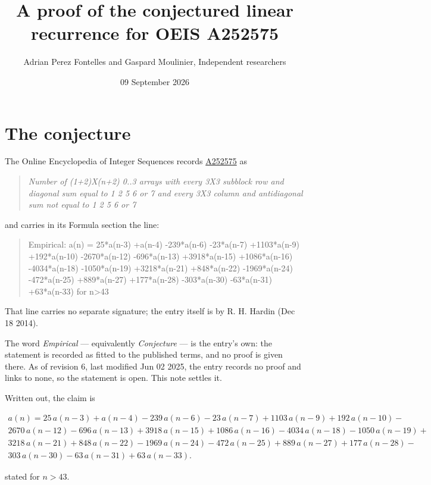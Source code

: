 \documentclass[11pt]{article}
\title{A proof of the conjectured linear recurrence for OEIS A252575}
\author{Adrian Perez Fontelles and Gaspard Moulinier, Independent researchers}
\date{09 September 2026}
\theoremstyle{definition}
\begin{document}
\maketitle
\section{The conjecture}

The Online Encyclopedia of Integer Sequences records \href{https://oeis.org/A252575}{A252575} as

\begin{quote}\itshape Number of (1+2)X(n+2) 0..3 arrays with every 3X3 subblock row and diagonal sum equal to 1 2 5 6 or 7 and every 3X3 column and antidiagonal sum not equal to 1 2 5 6 or 7\end{quote}

and carries in its Formula section the line:

\begin{quote}\ttfamily Empirical: a(n) = 25*a(n-3) +a(n-4) -239*a(n-6) -23*a(n-7) +1103*a(n-9) +192*a(n-10) -2670*a(n-12) -696*a(n-13) +3918*a(n-15) +1086*a(n-16) -4034*a(n-18) -1050*a(n-19) +3218*a(n-21) +848*a(n-22) -1969*a(n-24) -472*a(n-25) +889*a(n-27) +177*a(n-28) -303*a(n-30) -63*a(n-31) +63*a(n-33) for n>43\end{quote}

That line carries no separate signature; the entry itself is by R. H. Hardin (Dec 18 2014).

The word {\itshape Empirical} --- equivalently {\itshape Conjecture} --- is the entry's own: the statement is recorded as fitted to the published terms, and no proof is given there. As of revision 6, last modified Jun 02 2025, the entry records no proof and links to none, so the statement is open. This note settles it.

Written out, the claim is

\begin{multline*} a(n) = 25\,a(n-3) + a(n-4) - 239\,a(n-6) - 23\,a(n-7) + 1103\,a(n-9) + 192\,a(n-10) - \\ 2670\,a(n-12) - 696\,a(n-13) + 3918\,a(n-15) + 1086\,a(n-16) - 4034\,a(n-18) - 1050\,a(n-19) + \\ 3218\,a(n-21) + 848\,a(n-22) - 1969\,a(n-24) - 472\,a(n-25) + 889\,a(n-27) + 177\,a(n-28) - \\ 303\,a(n-30) - 63\,a(n-31) + 63\,a(n-33). \end{multline*}

stated for $n > 43$.
\end{document}
